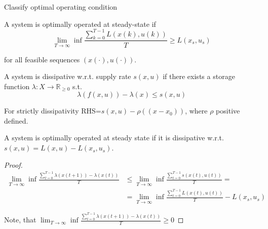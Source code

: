 Classify optimal operating condition

\begin{Definition}
 A system is optimally operated at steady-state if
 $$\lim_{T\rightarrow\infty}\inf\frac{\sum_{k=0}^{T-1}L(x(k),u(k))}{T} \ge L(x_s,u_s)$$

 for all feasible sequences $(x(\cdot), u(\cdot))$.
\end{Definition}

\begin{Definition}
 A system is dissipative w.r.t. supply rate $s(x,u)$ if there exists a storage 
 function $\lambda:X\rightarrow\mathbb{R}_{\ge 0}$ s.t.
 $$\lambda(f(x,u))-\lambda(x)\le s(x,u)$$

 For strictly dissipativity RHS=$s(x,u)-\rho((x-x_0))$, where $\rho$ positive defined.
\end{Definition}

\begin{Theorem}
 A system is optimally operated at steady state if it is dissipative w.r.t.
 $s(x,u)=L(x,u)-L(x_s,u_s)$.
 \begin{proof}
  \begin{equation}
   \begin{split}
    \lim_{T\rightarrow\infty}\inf\frac{\sum_{t=0}^{T-1}\lambda(x(t+1))-\lambda(x(t))}{T} &\le
           \lim_{T\rightarrow\infty}\inf\frac{\sum_{t=0}^{T-1}s(x(t),u(t))}{T}= \\
           &=\lim_{T\rightarrow\infty}\inf\frac{\sum_{t=0}^{T-1}L(x(t),u(t))}{T}-L(x_s,u_s)
   \end{split}
  \end{equation}

  Note, that $\lim_{T\rightarrow\infty}\inf\frac{\sum_{t=0}^{T-1}\lambda(x(t+1))-\lambda(x(t))}{T} \ge 0$
 \end{proof}
\end{Theorem}



